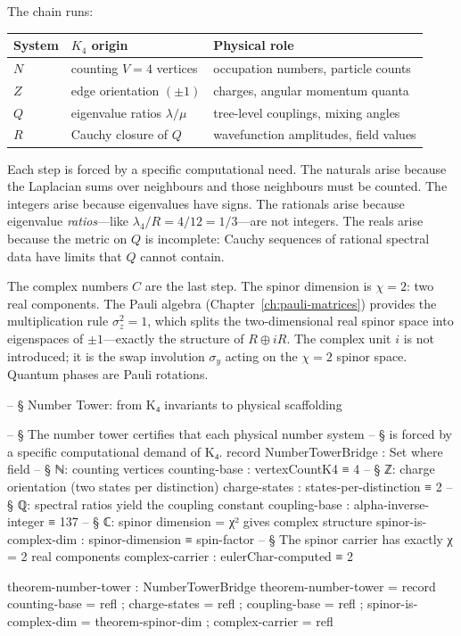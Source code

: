 \documentclass[11pt,a4paper]{book}
\def\mathbb#1{#1}%
\begin{document}
The chain runs:

\begin{center}
\begin{tabular}{lll}
\toprule
System & $K_4$ origin & Physical role \\
\midrule
$\mathbb{N}$ & counting $V = 4$ vertices & occupation numbers, particle counts \\
$\mathbb{Z}$ & edge orientation $(\pm 1)$ & charges, angular momentum quanta \\
$\mathbb{Q}$ & eigenvalue ratios $\lambda/\mu$ & tree-level couplings, mixing angles \\
$\mathbb{R}$ & Cauchy closure of $\mathbb{Q}$ & wavefunction amplitudes, field values \\
\bottomrule
\end{tabular}
\end{center}

Each step is forced by a specific computational need. The naturals arise because the Laplacian sums over neighbours and those neighbours must be counted. The integers arise because eigenvalues have signs. The rationals arise because eigenvalue \emph{ratios}---like $\lambda_4/R = 4/12 = 1/3$---are not integers. The reals arise because the metric on $\mathbb{Q}$ is incomplete: Cauchy sequences of rational spectral data have limits that $\mathbb{Q}$ cannot contain.

The complex numbers $\mathbb{C}$ are the last step. The spinor dimension is $\chi = 2$: two real components. The Pauli algebra (Chapter~\ref{ch:pauli-matrices}) provides the multiplication rule $\sigma_z^2 = 1$, which splits the two-dimensional real spinor space into eigenspaces of $\pm 1$---exactly the structure of $\mathbb{R} \oplus i\mathbb{R}$. The complex unit $i$ is not introduced; it is the swap involution $\sigma_y$ acting on the $\chi = 2$ spinor space. Quantum phases are Pauli rotations.

\begin{code}
-- § Number Tower: from K₄ invariants to physical scaffolding

-- § The number tower certifies that each physical number system
-- § is forced by a specific computational demand of K₄.
record NumberTowerBridge : Set where
  field
    -- § ℕ: counting vertices
    counting-base         : vertexCountK4 ≡ 4
    -- § ℤ: charge orientation (two states per distinction)
    charge-states         : states-per-distinction ≡ 2
    -- § ℚ: spectral ratios yield the coupling constant
    coupling-base         : alpha-inverse-integer ≡ 137
    -- § ℂ: spinor dimension = χ² gives complex structure
    spinor-is-complex-dim : spinor-dimension ≡ spin-factor
    -- § The spinor carrier has exactly χ = 2 real components
    complex-carrier       : eulerChar-computed ≡ 2

theorem-number-tower : NumberTowerBridge
theorem-number-tower = record
  { counting-base         = refl
  ; charge-states         = refl
  ; coupling-base         = refl
  ; spinor-is-complex-dim = theorem-spinor-dim
  ; complex-carrier       = refl }
\end{code}
\end{document}
